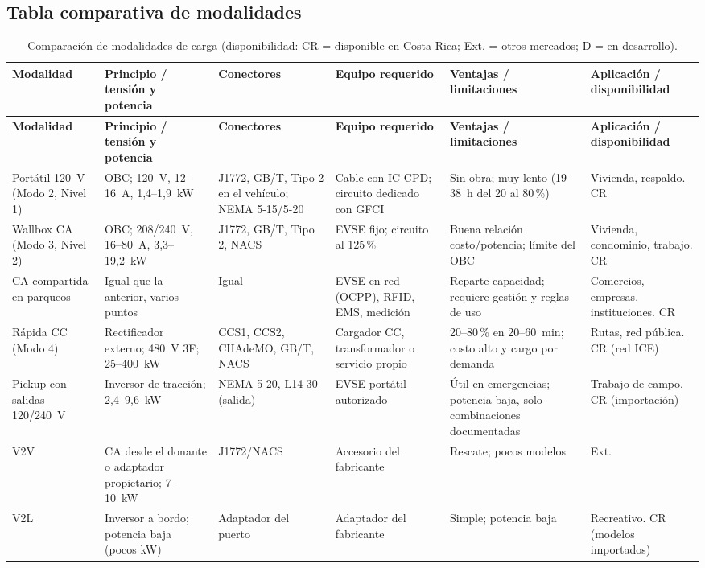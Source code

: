 \subsection{Tabla comparativa de modalidades}
{\small
\begin{longtable}{L{2.25cm}L{2.5cm}L{2.0cm}L{2.5cm}L{2.7cm}L{2.6cm}}
\caption{Comparación de modalidades de carga (disponibilidad: CR = disponible en Costa Rica; Ext. = otros mercados; D = en desarrollo).}\label{tab:modalidades}\\
\toprule
\textbf{Modalidad} & \textbf{Principio / tensión y potencia} & \textbf{Conectores} & \textbf{Equipo requerido} & \textbf{Ventajas / limitaciones} & \textbf{Aplicación / disponibilidad}\\
\midrule\endfirsthead
\toprule
\textbf{Modalidad} & \textbf{Principio / tensión y potencia} & \textbf{Conectores} & \textbf{Equipo requerido} & \textbf{Ventajas / limitaciones} & \textbf{Aplicación / disponibilidad}\\
\midrule\endhead
Portátil 120~V (Modo 2, Nivel 1) & OBC; 120~V, 12--16~A, 1,4--1,9~kW & J1772, GB/T, Tipo 2 en el vehículo; NEMA 5-15/5-20 & Cable con IC-CPD; circuito dedicado con GFCI & Sin obra; muy lento (19--38~h del 20 al 80\,\%) & Vivienda, respaldo. CR\\
Wallbox CA (Modo 3, Nivel 2) & OBC; 208/240~V, 16--80~A, 3,3--19,2~kW & J1772, GB/T, Tipo 2, NACS & EVSE fijo; circuito al 125\,\% & Buena relación costo/potencia; límite del OBC & Vivienda, condominio, trabajo. CR\\
CA compartida en parqueos & Igual que la anterior, varios puntos & Igual & EVSE en red (OCPP), RFID, EMS, medición & Reparte capacidad; requiere gestión y reglas de uso & Comercios, empresas, instituciones. CR\\
Rápida CC (Modo 4) & Rectificador externo; 480~V 3F; 25--400~kW & CCS1, CCS2, CHAdeMO, GB/T, NACS & Cargador CC, transformador o servicio propio & 20--80\,\% en 20--60~min; costo alto y cargo por demanda & Rutas, red pública. CR (red ICE)\\
Pickup con salidas 120/240~V & Inversor de tracción; 2,4--9,6~kW & NEMA 5-20, L14-30 (salida) & EVSE portátil autorizado & Útil en emergencias; potencia baja, solo combinaciones documentadas & Trabajo de campo. CR (importación)\\
V2V & CA desde el donante o adaptador propietario; 7--10~kW & J1772/NACS & Accesorio del fabricante & Rescate; pocos modelos & Ext.\\
V2L & Inversor a bordo; potencia baja (pocos kW) & Adaptador del puerto & Adaptador del fabricante & Simple; potencia baja & Recreativo. CR (modelos importados)\\

\end{longtable}}
